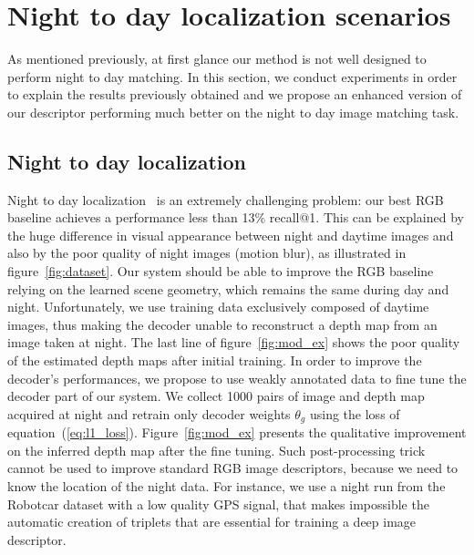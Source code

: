 \section{Night to day localization scenarios}
\label{sec:chall_loc}

As mentioned previously, at first glance our method is not well designed to perform night to day matching. In this section, we conduct experiments in order to explain the results previously obtained and we propose an enhanced version of our descriptor performing much better on the night to day image matching task.

\subsection{Night to day localization}


\label{subsec:night2day}

Night to day localization~\citep{Jenicek2019,Anoosheh2018} is an extremely challenging problem: our best RGB baseline achieves a performance less than 13\% recall@1. This can be explained by the huge difference in visual appearance between night and daytime images and also by the poor quality of night images (motion blur), as illustrated in figure~\ref{fig:dataset}. Our system should be able to improve the RGB baseline relying on the learned scene geometry, which remains the same during day and night. Unfortunately, we use training data exclusively composed of daytime images, thus making the decoder unable to reconstruct a depth map from an image taken at night. The last line of figure~\ref{fig:mod_ex} shows the poor quality of the estimated depth maps after initial training. In order to improve the decoder's performances, we propose to use weakly annotated data to fine tune the decoder part of our system. We collect 1000 pairs of image and depth map acquired at night and retrain only decoder weights $\theta_g$ using the loss of equation~(\ref{eq:l1_loss}). Figure~\ref{fig:mod_ex} presents the qualitative improvement on the inferred depth map after the fine tuning. Such post-processing trick cannot be used to improve standard RGB image descriptors, because we need to know the location of the night data. For instance, we use a night run from the Robotcar dataset with a low quality GPS signal, that makes impossible the automatic creation of triplets that are essential for training a deep image descriptor. 

